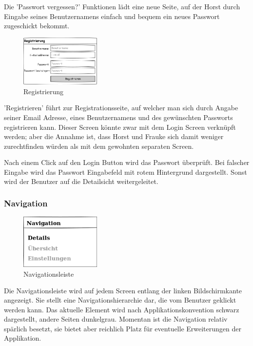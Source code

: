 Die 'Passwort vergessen?'  Funktionen l\"adt eine neue Seite, auf der Horst
durch Eingabe seines Benutzernamens einfach und bequem ein neues Passwort
zugeschickt bekommt.

\begin{figure}[htl]
\centering
\includegraphics[width=4cm]{img/web_register}
\caption{Registrierung}
\label{fig:web_register}
\end{figure}

'Registrieren' f\"uhrt zur Registrationsseite, auf welcher man sich durch
Angabe seiner Email Adresse, eines Benutzernamens und des gew\"unschten
Passworts registrieren kann. Dieser Screen k\"onnte zwar mit dem Login Screen
verkn\"upft werden; aber die Annahme ist, dass Horst und Frauke sich damit
weniger zurechtfinden w\"urden als mit dem gewohnten separaten Screen.

Nach einem Click auf den Login Button wird das Passwort \"uberpr\"uft. 
Bei falscher Eingabe wird das Passwort Eingabefeld mit rotem Hintergrund
dargestellt. Sonst wird der Benutzer auf die Detailsicht weitergeleitet.

\subsubsection{Navigation} \label{subsubsection:navigation}

\begin{figure}[htl]
\centering
\includegraphics[width=4cm]{img/web_navigation}
\caption{Navigationsleiste}
\label{fig:web_navigation}
\end{figure}

Die Navigationsleiste wird auf jedem Screen entlang der linken Bildschirmkante
angezeigt. Sie stellt eine Navigationshierarchie dar, die vom Benutzer geklickt
werden kann. Das aktuelle Element wird nach Applikationskonvention schwarz
dargestellt, andere Seiten dunkelgrau.  Momentan ist die Navigation relativ
spärlich besetzt, sie bietet aber reichlich Platz für eventuelle Erweiterungen
der Applikation.

